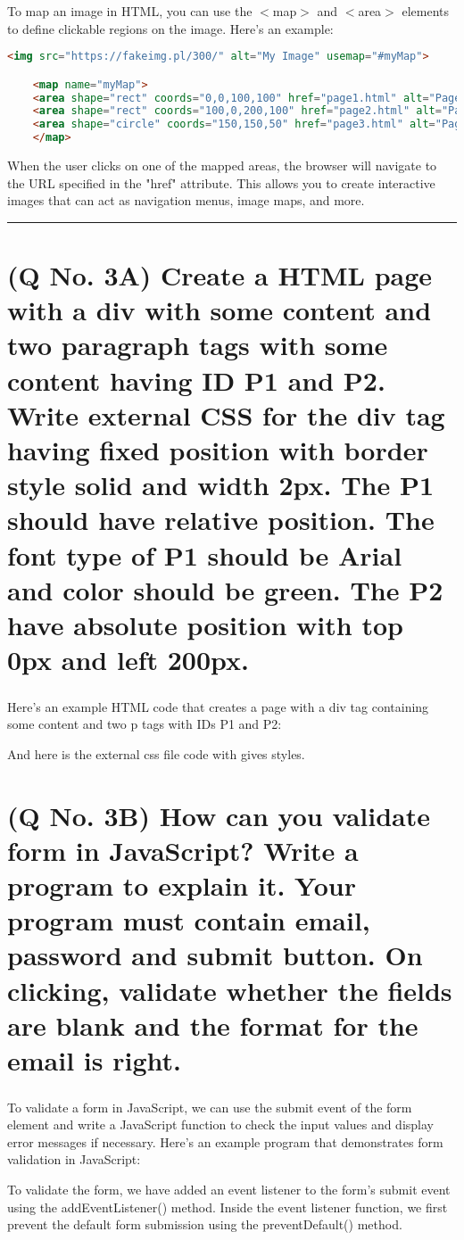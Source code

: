 \documentclass[11pt]{article}
\begin{document}
To map an image in HTML, you can use the $<$map$>$ and $<$area$>$ elements to define clickable regions on the image. Here's an example:
\begin{lstlisting}[language=html, caption={Image map}]
    <img src="https://fakeimg.pl/300/" alt="My Image" usemap="#myMap">

    <map name="myMap">
    <area shape="rect" coords="0,0,100,100" href="page1.html" alt="Page 1">
    <area shape="rect" coords="100,0,200,100" href="page2.html" alt="Page 2">
    <area shape="circle" coords="150,150,50" href="page3.html" alt="Page 3">
    </map>
\end{lstlisting}
When the user clicks on one of the mapped areas, the browser will navigate to the URL specified in the "href" attribute. This allows you to create interactive images that can act as navigation menus, image maps, and more.

\noindent\rule{\linewidth}{0.4pt}

\section{(Q No. 3A) Create a HTML page with a div with some content and two paragraph tags with some content having ID P1 and P2. Write external CSS for the div tag having fixed position with border style solid and width 2px. The P1 should have relative position. The font type of P1 should be Arial and color should be green. The P2 have absolute position with top 0px and left 200px.}
\subparagraph{}

Here's an example HTML code that creates a page with a div tag containing some content and two p tags with IDs P1 and P2:

And here is the external css file code with gives styles.



\section{(Q No. 3B) How can you validate form in JavaScript? Write a program to explain it. Your program must contain email, password and submit button. On clicking, validate whether the fields are blank and the format for the email is right.}
\subparagraph{}
To validate a form in JavaScript, we can use the submit event of the form element and write a JavaScript function to check the input values and display error messages if necessary. Here's an example program that demonstrates form validation in JavaScript:

To validate the form, we have added an event listener to the form's submit event using the addEventListener() method. Inside the event listener function, we first prevent the default form submission using the preventDefault() method.
\end{document}
